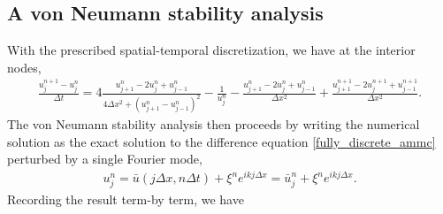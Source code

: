 \subsection{A von Neumann stability analysis}
With the prescribed spatial-temporal discretization, we have at the interior nodes,
\begin{align}
\frac{u^{n+1}_j - u^n_j}{\Delta t}
= 4\frac{u^n_{j+1} - 2u^n_j + u^n_{j-1}}{4\Delta x^2 + (u^n_{j+1} - u^n_{j-1})^2}
- \frac{1}{u^n_j} 
- \frac{u^n_{j+1} - 2u^n_j + u^n_{j-1}}{\Delta x^2} 
+ \frac{u^{n+1}_{j+1} - 2u^{n+1}_j + u^{n+1}_{j-1}}{\Delta x^2}.
\label{fully_discrete_ammc}
\end{align} 
The von Neumann stability analysis then proceeds by writing the numerical solution as the exact solution to the difference equation \eqref{fully_discrete_ammc} perturbed by a single Fourier mode, 
\begin{align}
u^n_j = \bar u(j\Delta x, n\Delta t) 
+ \xi^n e^{ikj\Delta x}
= \bar u^n_j + \xi^n e^{ikj\Delta x}.
\end{align}
Recording the result term-by term, we have 
